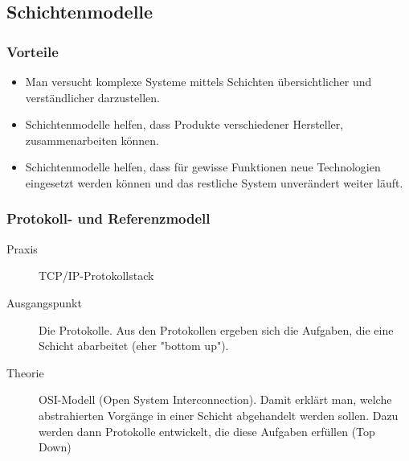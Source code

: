 \documentclass[a4paper,10pt]{article}
\begin{document}
\subsection{Schichtenmodelle}
\subsubsection{Vorteile}
\begin{itemize}
 \item Man versucht komplexe Systeme mittels Schichten übersichtlicher und verständlicher darzustellen.
 \item Schichtenmodelle helfen, dass Produkte verschiedener Hersteller, zusammenarbeiten können.
 \item Schichtenmodelle helfen, dass für gewisse Funktionen neue Technologien eingesetzt werden können und das restliche System unverändert weiter läuft.
\end{itemize}
\subsubsection{Protokoll- und Referenzmodell}
\begin{description}
\item[Praxis] TCP/IP-Protokollstack
\item[Ausgangspunkt] Die Protokolle. Aus den Protokollen ergeben sich die Aufgaben, die eine Schicht abarbeitet (eher "bottom up").
\item[Theorie] OSI-Modell (Open System Interconnection). Damit erklärt man, welche abstrahierten Vorgänge in einer Schicht abgehandelt werden sollen. Dazu werden dann Protokolle entwickelt, die diese Aufgaben erfüllen (Top Down)
\end{description}
\end{document}
